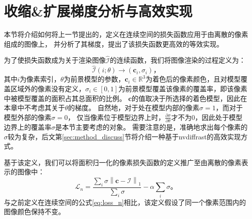 \section{收缩\&扩展梯度分析与高效实现}

本节将介绍如何将上一节提出的，定义在连续空间的损失函数应用于由离散的像素组成的图像上，
并分析了其梯度，提出了该损失函数更高效的等效实现。

为了使损失函数成为关于渲染图像$\hat{\mathcal{I}}$的连续函数，我们将图像渲染的过程定义为：
\begin{equation}
\hat{\mathcal{I}}(i;\theta) \to (\mathbf{c}_i, \sigma_i)
\text{，}
\end{equation}
其中$i$为像素索引，$\theta$为前景模型的参数，$\mathbf{c}_i\in\mathbb{R}^3$为着色后的像素颜色，且对模型覆盖区域外的像素没有定义，$\sigma_i\in[0,1]$为前景模型覆盖该像素的覆盖率，即该像素中被模型覆盖的面积占其总面积的比例。
$\mathbf{c}$的值取决于所选择的着色模型，因此在本章中不考虑其关于$\theta$的梯度。
自然地，对于处在模型内部的像素$\sigma=1$，而对于模型外部的像素$\sigma=0$，
仅当像素位于模型边界上时，$\frac{\partial\sigma}{\partial\theta}$才不为0，因此处于模型边界上的覆盖率$\sigma$是本节主要考虑的对象。
需要注意的是，准确地求出每个像素的$\sigma$较为复杂，后文第\ref{sec:method_discuss}节将介绍一种基于nvdiffrast的高效实现方式。

基于该定义，我们可以将面积归一化的像素损失函数的定义推广至由离散的像素表示的图像中：
\begin{equation}
\mathcal{L}_n = \frac{\sum_{i} \sigma \left\| \mathbf{c} - \mathcal{I} \right\|_1}
{\sum_{i} \sigma} - \alpha \sum_{i} \sigma
\text{。}
\label{eq:loss_n_pixel}
\end{equation}
与之前定义在连续空间的公式\ref{eq:loss_n}相比，该定义假设了同一个像素范围内的图像颜色保持不变。

